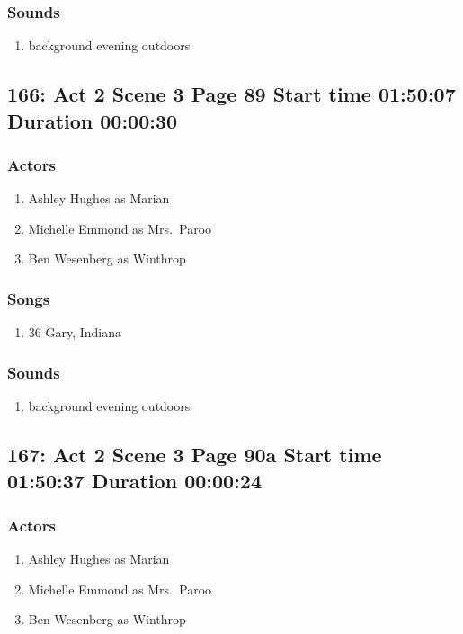 \subsubsection{Sounds}
\begin{enumerate}
\item background evening outdoors
\end{enumerate}
\subsection{166: Act 2 Scene 3 Page 89 Start time 01:50:07 Duration 00:00:30}

\subsubsection{Actors}
\begin{enumerate}
\item Ashley Hughes as Marian
\item Michelle Emmond as Mrs.~Paroo
\item Ben Wesenberg as Winthrop
\end{enumerate}

\subsubsection{Songs}
\begin{enumerate}
\item 36 Gary, Indiana
\end{enumerate}\subsubsection{Sounds}
\begin{enumerate}
\item background evening outdoors
\end{enumerate}
\subsection{167: Act 2 Scene 3 Page 90a Start time 01:50:37 Duration 00:00:24}

\subsubsection{Actors}
\begin{enumerate}
\item Ashley Hughes as Marian
\item Michelle Emmond as Mrs.~Paroo
\item Ben Wesenberg as Winthrop
\end{enumerate}

